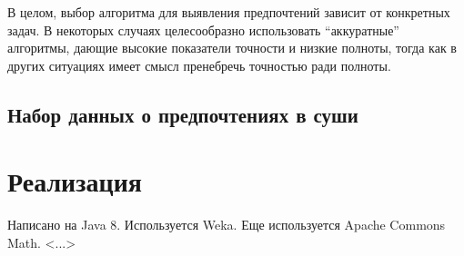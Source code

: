 	В целом, выбор алгоритма для выявления предпочтений зависит от конкретных задач. В некоторых случаях целесообразно использовать ``аккуратные'' алгоритмы, дающие высокие показатели точности и низкие полноты, тогда как в других ситуациях имеет смысл пренебречь точностью ради полноты.
	
	
	\subsection{Набор данных о предпочтениях в суши} 
	\label{subsec:exp_sushi}
	


\section{Реализация}
	Написано на Java 8. Используется Weka. Еще используется Apache Commons Math.
	<...>
